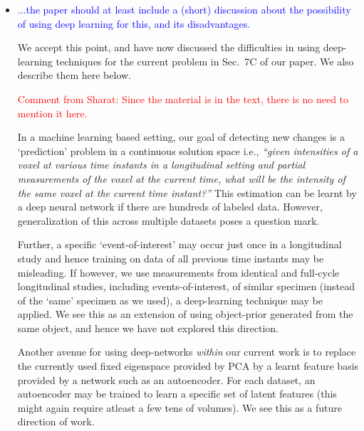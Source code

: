 \documentclass{article}
\begin{document}
 \begin{itemize}
 \item    \textcolor{blue}{...the paper should at least include a (short) discussion about the
     possibility of using deep learning for this, and its disadvantages.}

   We accept this point, and have now discussed the difficulties in
   using deep-learning techniques for the current problem in Sec.~7C
   of our paper. We also describe them here below.

\textcolor{red}{Comment from Sharat:  Since the material is in the text, there is no need to mention it here.}
   
   
  In a machine learning based setting, our goal of detecting new
  changes is a `prediction' problem in a continuous solution space
  i.e., \textit{``given intensities of a voxel at various time
    instants in a longitudinal setting and partial measurements of the
    voxel at the current time, what will be the intensity of the same
    voxel at the current time instant?''} This estimation can be
  learnt by a deep neural network if there are hundreds of labeled
  data.  However, generalization of this across multiple datasets
  poses a question mark.
  

  Further, a specific `event-of-interest' may occur just once in a
  longitudinal study and hence training on data of all previous time
  instants may be misleading. If however, we use measurements from
  identical and full-cycle longitudinal studies, including
  events-of-interest, of similar specimen (instead of the `same'
  specimen as we used), a deep-learning technique may be applied. We
  see this as an extension of using object-prior generated from the
  same object, and hence we have not explored this direction.

  Another avenue for using deep-networks \textit{within} our current
  work is to replace the currently used fixed eigenspace provided by
  PCA by a learnt feature basis provided by a network such as an
  autoencoder. For each dataset, an autoencoder may be trained to
  learn a specific set of latent features (this might again require
  atleast a few tens of volumes). We see this as a future direction of
  work.


\end{itemize}
\end{document}

